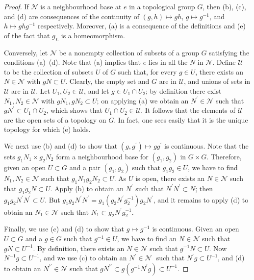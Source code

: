 \documentclass[a4paper,11pt,final,openany]{memoir}
\theoremstyle{nonumberplain}
\newtheorem{proof}{Proof.}
\begin{document}
\begin{proof}
If $\mathcal{N}{}$ is a neighbourhood base at $e$ in a topological group $G$,
then (b), (c), and (d) are consequences of the continuity of $(g,h)\mapsto
gh$, $g\mapsto g^{-1}$, and $h\mapsto ghg^{-1}$ respectively. Moreover, (a) is
a consequence of the definitions and (e) of the fact that $g_{L}$ is a homeomorphism.

Conversely, let $\mathcal{N}{}$ be a nonempty collection of subsets of a group
$G$ satisfying the conditions (a)--(d). Note that (a) implies that $e$ lies in
all the $N$ in $\mathcal{N}{}$. Define $\mathcal{U}{}$ to be the collection of
subsets $U$ of $G$ such that, for every $g\in U$, there exists an
$N\in\mathcal{N}{}$ with $gN\subset U$. Clearly, the empty set and $G$ are in
$\mathcal{U}{}$, and unions of sets in $\mathcal{U}{}$ are in $\mathcal{U}{}$.
Let $U_{1},U_{2}\in\mathcal{U}{}$, and let $g\in U_{1}\cap U_{2}$; by
definition there exist $N_{1},N_{2}\in\mathcal{N}{}$ with $gN_{1}%
,gN_{2}\subset U$; on applying (a) we obtain an $N^{\prime}\in\mathcal{N}{}$
such that $gN^{\prime}\subset U_{1}\cap U_{2}$, which shows that $U_{1}\cap
U_{2}\in\mathcal{U}{}$. It follows that the elements of $\mathcal{U}{}$ are
the open sets of a topology on $G$. In fact, one sees easily that it is the
unique topology for which (e) holds.

We next use (b) and (d) to show that $(g,g^{\prime})\mapsto gg^{\prime}$ is
continuous. Note that the sets $g_{1}N_{1}\times g_{2}N_{2}$ form a
neighbourhood base for $(g_{1},g_{2})$ in $G\times G$. Therefore, given an
open $U\subset G$ and a pair $(g_{1},g_{2})$ such that $g_{1}g_{2}\in U$, we
have to find $N_{1},N_{2}\in\mathcal{N}{}$ such that $g_{1}N_{1}g_{2}%
N_{2}\subset U$. As $U$ is open, there exists an $N\in\mathcal{N}{}$ such that
$g_{1}g_{2}N\subset U$. Apply (b) to obtain an $N^{\prime}$ such that
$N^{\prime}N^{\prime}\subset N$; then $g_{1}g_{2}N^{\prime}N^{\prime}\subset
U$. But $g_{1}g_{2}N^{\prime}N^{\prime}=g_{1}(g_{2}N^{\prime}g_{2}^{-1}%
)g_{2}N^{\prime}$, and it remains to apply (d) to obtain an $N_{1}%
\in\mathcal{N}{}$ such that $N_{1}\subset g_{2}N^{\prime}g_{2}^{-1}$.

Finally, we use (c) and (d) to show that $g\mapsto g^{-1}$ is continuous.
Given an open $U\subset G$ and a $g\in G$ such that $g^{-1}\in U$, we have to
find an $N\in\mathcal{N}{}$ such that $gN\subset U^{-1}$. By definition, there
exists an $N\in\mathcal{N}{}$ such that $g^{-1}N\subset U$. Now $N^{-1}%
g\subset U^{-1}$, and we use (c) to obtain an $N^{\prime}\in\mathcal{N}{}$
${}$ such that $N^{\prime}g\subset U^{-1}$, and (d) to obtain an
$N^{\prime\prime}\in\mathcal{N}{}$ such that $gN^{\prime\prime}\subset
g(g^{-1}N^{\prime}g)\subset U^{-1}$.
\end{proof}
\end{document}

